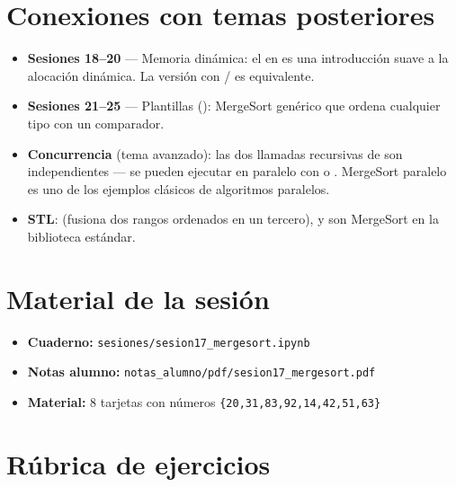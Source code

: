 \documentclass[12pt, oneside]{article}
\begin{document}
\section{Conexiones con temas posteriores}

\begin{itemize}
  \item \textbf{Sesiones 18--20} — Memoria dinámica: el 
    en  es una introducción suave a la alocación dinámica.
    La versión con  /  es equivalente.
  \item \textbf{Sesiones 21--25} — Plantillas ():
    MergeSort genérico que ordena cualquier tipo con un comparador.
  \item \textbf{Concurrencia} (tema avanzado): las dos llamadas recursivas de
     son independientes — se pueden ejecutar en paralelo con
     o . MergeSort paralelo es uno de los
    ejemplos clásicos de algoritmos paralelos.
  \item \textbf{STL}:  (fusiona dos rangos ordenados en un
    tercero),  y  son
    MergeSort en la biblioteca estándar.
\end{itemize}

\section{Material de la sesión}

\begin{itemize}
  \item \textbf{Cuaderno:} \texttt{sesiones/sesion17\_mergesort.ipynb}
  \item \textbf{Notas alumno:} \texttt{notas\_alumno/pdf/sesion17\_mergesort.pdf}
  \item \textbf{Material:} 8 tarjetas con números
        \texttt{\{20,31,83,92,14,42,51,63\}}
\end{itemize}

\section{Rúbrica de ejercicios}
\end{document}
